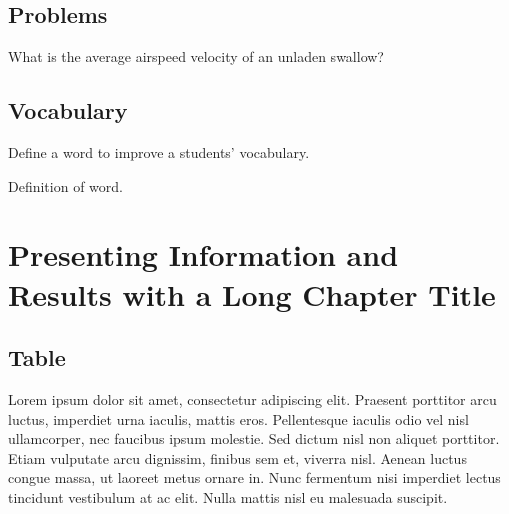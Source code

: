 \documentclass[
	11pt,
	fleqn,
	a4paper,
]{LegrandOrangeBook}
\begin{document}

\section{Problems}

\begin{problem} %
What is the average airspeed velocity of an unladen swallow?
\end{problem}


\section{Vocabulary}

Define a word to improve a students' vocabulary.

\begin{vocabulary}[Word] %
    Definition of word.
\end{vocabulary}


\chapterspaceabove{6.25cm} %
\chapterspacebelow{7.5cm} %


\chapter{Presenting Information and Results with a Long Chapter Title}

\section{Table}

Lorem ipsum dolor sit amet, consectetur adipiscing elit. Praesent porttitor arcu luctus, imperdiet urna iaculis, mattis eros. Pellentesque iaculis odio vel nisl ullamcorper, nec faucibus ipsum molestie. Sed dictum nisl non aliquet porttitor. Etiam vulputate arcu dignissim, finibus sem et, viverra nisl. Aenean luctus congue massa, ut laoreet metus ornare in. Nunc fermentum nisi imperdiet lectus tincidunt vestibulum at ac elit. Nulla mattis nisl eu malesuada suscipit.
\end{document}
